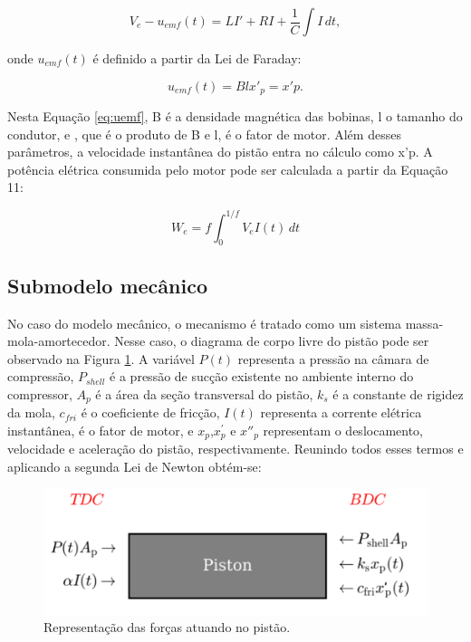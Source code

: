\begin{equation}\label{eq:eletrico}
V_e-u_{emf}(t)= LI'+RI+\frac{1}{C} \int I \,dt ,
\end{equation}


onde $u_{emf}(t)$ é definido a partir da Lei de Faraday:




\begin{equation}\label{eq:uemf}
u_{emf}(t)=Blx'_p= x'p.
\end{equation}


Nesta Equação \ref{eq:uemf}, B é a densidade magnética das bobinas, l o tamanho do condutor, e , que é o produto de B e l, é o fator de motor. Além desses parâmetros, a velocidade instantânea do pistão entra no cálculo como x'p.
A potência elétrica consumida pelo motor pode ser calculada a partir da Equação 11:

\begin{equation}\label{eq:uemf}
W_{e} = f \int_{0}^{1/f} V_eI(t)\,dt
\end{equation}


\subsection{Submodelo mecânico}

No caso do modelo mecânico, o mecanismo é tratado como um sistema massa-mola-amortecedor. Nesse caso, o diagrama de corpo livre do pistão pode ser observado na Figura \ref{fig:forcas-atuando}. A variável $P(t)$ representa a pressão na câmara de compressão, $P_{shell}$ é a pressão de sucção existente no ambiente interno do compressor, $A_p$ é a área da seção transversal do pistão, $k_s$ é a constante de rigidez da mola, $c_{fri}$ é o coeficiente de fricção, $I(t)$ representa a corrente elétrica instantânea,  é o fator de motor, e $x_p$,$x^{'} _p$ e $x{''} _p$ representam o deslocamento, velocidade e aceleração do pistão, respectivamente. Reunindo todos esses termos e aplicando a segunda Lei de Newton obtém-se:


\begin{figure}[htb]
	\caption{\label{fig:forcas-atuando} Representação das forças atuando no pistão.}
	\begin{center}
		\includegraphics[scale=0.65]{images/pistao.png}
	\end{center}
\end{figure}

